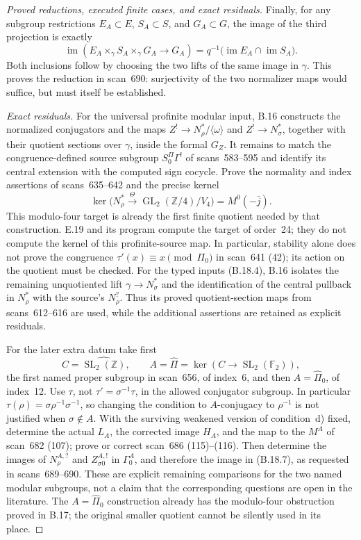 \begin{proof}[Proved reductions, executed finite cases, and exact residuals]
Finally, for any subgroup restrictions \(E_A\subset E\),
\(S_A\subset S\), and \(G_A\subset G\), the image of
the third projection is exactly
\[
 \operatorname{im}(E_A\times_\gamma S_A\times_\gamma G_A
       \longrightarrow G_A)
 =q^{-1}\bigl(\operatorname{im}E_A\cap\operatorname{im}S_A\bigr).
                                                               \tag{B.18.7}
\]
Both inclusions follow by choosing the two lifts of the
same image in \(\gamma\).  This proves the reduction in
scan~690: surjectivity of the two normalizer maps would
suffice, but must itself be established.

\emph{Exact residuals.}
For the universal profinite modular input, B.16 constructs
the normalized conjugators and the maps
\(Z^!\to N_\rho^*/\langle\omega\rangle\) and
\(Z^!\to N_\sigma^*\), together with their quotient
sections over \(\gamma\), inside the formal \(G_Z\).
It remains to match the congruence-defined source subgroup
\(S_0^\Pi\Gamma^!\) of scans~583--595 and identify
its central extension with the computed sign cocycle.
Prove the normality and index assertions of scans~635--642
and the precise kernel
\[
 \ker\bigl(N_\rho^*\xrightarrow{\Theta}
       \operatorname{GL}_2(\mathbb Z/4)/V_4\bigr)
          =M^0(-\bar j).                              \tag{B.18.8}
\]
This modulo-four target is already the first finite quotient
needed by that construction.  E.19 and its program compute
the target of order~24; they do not compute the kernel of
this profinite-source map.  In particular, stability alone
does not prove the congruence \(\tau'(x)\equiv x\pmod{\Pi_0}\)
in scan~641 (42); its action on the quotient must be checked.
For the typed inputs (B.18.4), B.16 isolates the remaining
unquotiented lift \(\gamma\to N_\sigma^*\) and the
identification of the central pullback in \(N_\rho^*\)
with the source's \(N_\rho^?\).  Thus its proved
quotient-section maps from scans~612--616 are used, while
the additional assertions are retained as explicit residuals.

For the later extra datum take first
\[
 C=\widehat{\operatorname{SL}_2(\mathbb Z)},\qquad
 A=\widehat\Pi=\ker(C\to\operatorname{SL}_2(\mathbb F_2)),
\]
the first named proper subgroup in scan~656, of index~6,
and then \(A=\widehat\Pi_0\), of index~12.
Use \(\tau\), not \(\tau'=\sigma^{-1}\tau\), in the
allowed conjugator subgroup.  In particular
\(\tau(\rho)=\sigma\rho^{-1}\sigma^{-1}\), so changing
the condition to \(A\)-conjugacy to \(\rho^{-1}\) is
not justified when \(\sigma\notin A\).
With the surviving weakened version of condition~d) fixed,
determine the actual \(L_A\), the corrected image \(H_A\),
and the map to the \(M^A\) of scan~682 (107); prove or
correct scan~686 (115)--(116).  Then determine the images
of \(N_\rho^{A,?}\) and \(Z_{\sigma0}^{A,!}\) in
\(\Gamma_0^A\), and therefore the image in (B.18.7),
as requested in scans~689--690.  These are explicit remaining
comparisons for the two named modular subgroups, not a claim
that the corresponding questions are open in the literature.
The \(A=\widehat\Pi_0\) construction already has the
modulo-four obstruction proved in B.17; the original smaller
quotient cannot be silently used in its place.


\end{proof}
